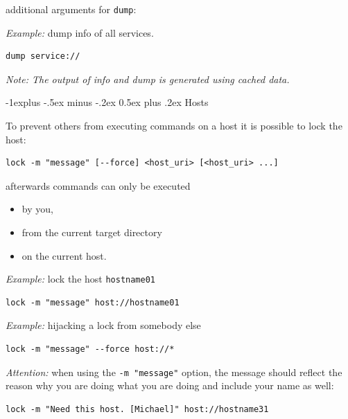 \documentclass[10pt,landscape]{article}
\makeatletter
\renewcommand{\subsection}{\@startsection{subsection}{2}{0mm}%
                                {-1explus -.5ex minus -.2ex}%
                                {0.5ex plus .2ex}%
                                {\normalfont\normalsize\bfseries}}
\makeatother
\begin{document}
\begin{multicols}{3}
additional arguments for \verb+dump+:
\begin{description}[font=\bfseries,leftmargin=1.5cm,style=sameline]
    \item [--attribute]
    \item [--show-pending-updates]
    \item [--show-current-artefacts]
\end{description}

\emph{Example:} dump info of all services.
\begin{lstlisting}
dump service://
\end{lstlisting}

\emph{Note: The output of info and dump is generated using cached data.}



\vfill\columnbreak
\subsection{Hosts}

To prevent others from executing commands on a host it is possible to lock the host:
\begin{lstlisting}
lock -m "message" [--force] <host_uri> [<host_uri> ...]
\end{lstlisting}

afterwards commands can only be executed
\begin{itemize}
\item by you,
\item from the current target directory
\item on the current host.
\end{itemize}

\emph{Example:} lock the host \verb+hostname01+
\begin{lstlisting}
lock -m "message" host://hostname01
\end{lstlisting}

\emph{Example:} hijacking a lock from somebody else
\begin{lstlisting}
lock -m "message" --force host://*
\end{lstlisting}

\emph{Attention:} when using the \verb+-m "message"+ option, the message
should reflect the reason why you are doing what you are doing and
include your name as well:
\begin{lstlisting}
lock -m "Need this host. [Michael]" host://hostname31
\end{lstlisting}


\end{multicols}
\end{document}
